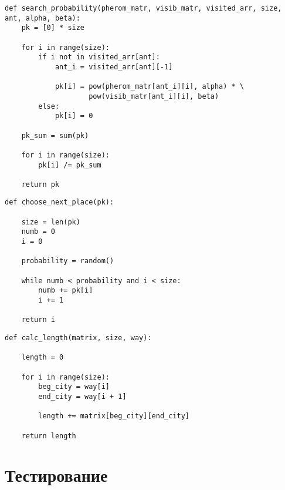 \begin{center}
\captionsetup{justification=raggedright,singlelinecheck=off}
\begin{lstlisting}[label=lst:search_probability,caption=Функция для нахождения вероятней перехода в каждый из городов]
def search_probability(pherom_matr, visib_matr, visited_arr, size, ant, alpha, beta):
    pk = [0] * size

    for i in range(size):
        if i not in visited_arr[ant]:
            ant_i = visited_arr[ant][-1]

            pk[i] = pow(pherom_matr[ant_i][i], alpha) * \
                    pow(visib_matr[ant_i][i], beta)
        else:
            pk[i] = 0

    pk_sum = sum(pk)

    for i in range(size):
        pk[i] /= pk_sum  

    return pk
\end{lstlisting}
\end{center}


\begin{center}
\captionsetup{justification=raggedright,singlelinecheck=off}
\begin{lstlisting}[label=lst:choose_next_place,caption=Функция выбора следующего города]
def choose_next_place(pk):

    size = len(pk)
    numb = 0
    i = 0

    probability = random()

    while numb < probability and i < size:
        numb += pk[i]
        i += 1

    return i
\end{lstlisting}
\end{center}	

\begin{center}
\captionsetup{justification=raggedright,singlelinecheck=off}
\begin{lstlisting}[label=lst:calc_length,caption= Функция нахождения длины пути]
def calc_length(matrix, size, way):

    length = 0

    for i in range(size):
        beg_city = way[i]
        end_city = way[i + 1]

        length += matrix[beg_city][end_city]

    return length
\end{lstlisting}
\end{center}


\section{Тестирование}

